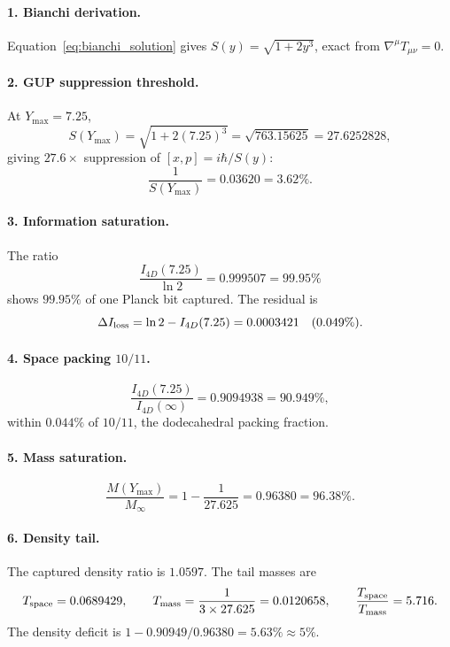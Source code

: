 \documentclass[a4paper,1pt,oneside,openany]{book}
\begin{document}
\paragraph{1. Bianchi derivation.} Equation~\eqref{eq:bianchi_solution} gives \(S(y) = \sqrt{1+2y^3}\), exact from \(\nabla^\mu T_{\mu\nu} = 0\).

\paragraph{2. GUP suppression threshold.} At \(Y_{\max} = 7.25\),
\begin{equation}
S(Y_{\max}) = \sqrt{1+2(7.25)^3} = \sqrt{763.15625} = 27.6252828,
\end{equation}
giving \(27.6\times\) suppression of \([x,p] = i\hbar/S(y)\):
\begin{equation}
\frac{1}{S(Y_{\max})} = 0.03620 = 3.62\%.
\end{equation}

\paragraph{3. Information saturation.} The ratio
\begin{equation}
\frac{I_{4D}(7.25)}{\ln 2} = 0.999507 = 99.95\%
\end{equation}
shows \(99.95\%\) of one Planck bit captured. The residual is
\begin{equation}
\Delta I_{\rm loss} = \ln 2 - I_{4D}(7.25) = 0.0003421 \quad (0.049\%).
\end{equation}

\paragraph{4. Space packing \(10/11\).} 
\begin{equation}
\frac{I_{4D}(7.25)}{I_{4D}(\infty)} = 0.9094938 = 90.949\%,
\end{equation}
within \(0.044\%\) of \(10/11\), the dodecahedral packing fraction.

\paragraph{5. Mass saturation.} 
\begin{equation}
\frac{M(Y_{\max})}{M_\infty} = 1 - \frac{1}{27.625} = 0.96380 = 96.38\%.
\end{equation}

\paragraph{6. Density tail.} The captured density ratio is \(1.0597\). The tail masses are
\begin{equation}
T_{\rm space} = 0.0689429, \qquad T_{\rm mass} = \frac{1}{3 \times 27.625} = 0.0120658, \qquad \frac{T_{\rm space}}{T_{\rm mass}} = 5.716.
\end{equation}
The density deficit is \(1 - 0.90949/0.96380 = 5.63\% \approx 5\%\).
\end{document}
